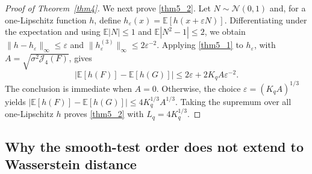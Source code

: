 \documentclass[letterpaper,11pt,reqno]{amsart}
\numberwithin{equation}{section}
\theoremstyle{plain}
\theoremstyle{definition}
\theoremstyle{remark}
\newcommand{\E}{\mathbb{E}}
\newcommand{\NN}{\mathcal{N}}
\newcommand{\eps}{\varepsilon}
\newcommand{\Jfour}{\mathcal J_4}
\begin{document}
\begin{proof}[Proof of Theorem~\ref{thm4}]
\medskip

We next prove \eqref{thm5_2}.  Let $N\sim\NN(0,1)$ and, for a
one-Lipschitz function $h$, define
$h_\eps(x)=\E[h(x+\eps N)]$.  Differentiating under the expectation
and using $\E|N|\leq1$ and $\E|N^2-1|\leq2$, we obtain
$\|h-h_\eps\|_\infty\leq\eps$ and
$\|h_\eps^{(3)}\|_\infty\leq2\eps^{-2}$.  Applying
\eqref{thm5_1} to $h_\eps$, with
$A=\sqrt{\sigma^2\Jfour(F)}$, gives
\[
 |\E[h(F)]-\E[h(G)]|
 \leq2\eps+2K_qA\eps^{-2}.
\]
The conclusion is immediate when $A=0$.  Otherwise, the choice
$\eps=(K_qA)^{1/3}$ yields
$|\E[h(F)]-\E[h(G)]|\leq4K_q^{1/3}A^{1/3}$.  Taking the supremum
over all one-Lipschitz $h$ proves \eqref{thm5_2} with
$L_q=4K_q^{1/3}$.
\qedhere

\end{proof}


\subsection{Why the smooth-test order does not extend to Wasserstein distance}
\label{SEC_50b}
\end{document}
